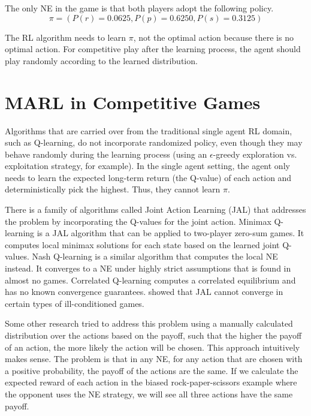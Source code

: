 \documentclass[a4paper]{article}
\begin{document}
\begin{multicols}{2}
The only NE in the game is that both players adopt the following policy.
\begin{equation}
\pi=(P(r)=0.0625,P(p)=0.6250,P(s)=0.3125)
\label{eq:biasedrpspolicy}
\end{equation}

The RL algorithm needs to learn $\pi$, not the optimal action because there is no optimal action. For competitive play after the learning process, the agent should play randomly according to the learned distribution.

\section{MARL in Competitive Games}
Algorithms that are carried over from the traditional single agent RL domain, such as Q-learning, do not incorporate randomized policy, even though they may behave randomly during the learning process (using an $\epsilon$-greedy exploration vs. exploitation strategy, for example). In the single agent setting, the agent only needs to learn the expected long-term return (the Q-value) of each action and deterministically pick the highest. Thus, they cannot learn $\pi$.

There is a family of algorithms called Joint Action Learning (JAL) that addresses the problem by incorporating the Q-values for the joint action. Minimax Q-learning \cite{littman1994markov} is a JAL algorithm that can be applied to two-player zero-sum games. It computes local minimax solutions for each state based on the learned joint Q-values. Nash Q-learning \cite{hu2003nash} is a similar algorithm that computes the local NE instead. It converges to a NE under highly strict assumptions that is found in almost no games. Correlated Q-learning \cite{greenwald2003correlated} computes a correlated equilibrium and has no known convergence guarantees. \cite{zinkevich2005cyclic} showed that JAL cannot converge in certain types of ill-conditioned games.

Some other research \cite{qu2020distributed} tried to address this problem using a manually calculated distribution over the actions based on the payoff, such that the higher the payoff of an action, the more likely the action will be chosen. This approach intuitively makes sense. The problem is that in any NE, for any action that are chosen with a positive probability, the payoff of the actions are the same. If we calculate the expected reward of each action in the biased rock-paper-scissors example where the opponent uses the NE strategy, we will see all three actions have the same payoff.


\end{multicols}
\end{document}
